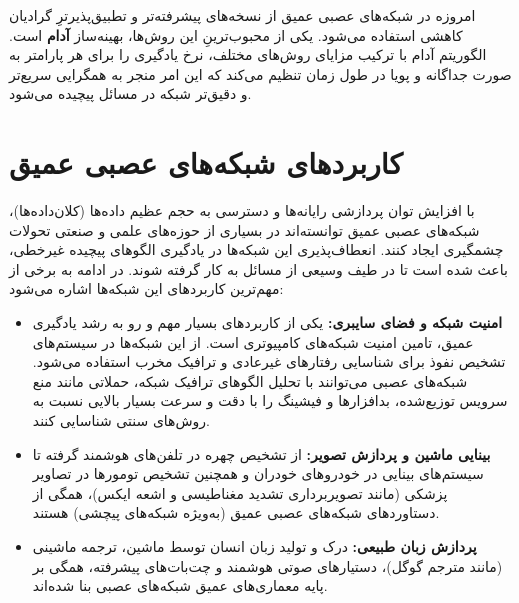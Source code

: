 امروزه در شبکه‌های عصبی عمیق از نسخه‌های پیشرفته‌تر و تطبیق‌پذیرترِ گرادیان کاهشی استفاده می‌شود. یکی از محبوب‌ترینِ این روش‌ها، بهینه‌ساز \textbf{آدام} است.\cite{kingma2014adam}
 الگوریتم آدام با ترکیب مزایای روش‌های مختلف، نرخ یادگیری را برای هر پارامتر به صورت جداگانه و پویا در طول زمان تنظیم می‌کند که این امر منجر به همگرایی سریع‌تر و دقیق‌تر شبکه در مسائل پیچیده می‌شود.
\section{کاربردهای شبکه‌های عصبی عمیق}\label{sec:4-5}
با افزایش توان پردازشی رایانه‌ها و دسترسی به حجم عظیم داده‌ها (کلان‌داده‌ها)، شبکه‌های عصبی عمیق توانسته‌اند در بسیاری از حوزه‌های علمی و صنعتی تحولات چشمگیری ایجاد کنند. انعطاف‌پذیری این شبکه‌ها در یادگیری الگوهای پیچیده غیرخطی، باعث شده است تا در طیف وسیعی از مسائل به کار گرفته شوند. در ادامه به برخی از مهم‌ترین کاربردهای این شبکه‌ها اشاره می‌شود:

\begin{itemize}
	\item \textbf{امنیت شبکه و فضای سایبری:} یکی از کاربردهای بسیار مهم و رو به رشد یادگیری عمیق، تامین امنیت شبکه‌های کامپیوتری است. از این شبکه‌ها در سیستم‌های تشخیص نفوذ برای شناسایی رفتارهای غیرعادی و ترافیک مخرب استفاده می‌شود. شبکه‌های عصبی می‌توانند با تحلیل الگوهای ترافیک شبکه، حملاتی مانند منع سرویس توزیع‌شده، بدافزارها و فیشینگ را با دقت و سرعت بسیار بالایی نسبت به روش‌های سنتی شناسایی کنند.\cite{xin2018machine}
	\item \textbf{بینایی ماشین و پردازش تصویر:} از تشخیص چهره در تلفن‌های هوشمند گرفته تا سیستم‌های بینایی در خودروهای خودران و همچنین تشخیص تومورها در تصاویر پزشکی (مانند تصویربرداری تشدید مغناطیسی و اشعه ایکس)، همگی از دستاوردهای شبکه‌های عصبی عمیق (به‌ویژه شبکه‌های پیچشی) هستند.
	
	\item \textbf{پردازش زبان طبیعی:} درک و تولید زبان انسان توسط ماشین، ترجمه ماشینی (مانند مترجم گوگل)، دستیارهای صوتی هوشمند و چت‌بات‌های پیشرفته، همگی بر پایه معماری‌های عمیق شبکه‌های عصبی بنا شده‌اند.
\end{itemize}

